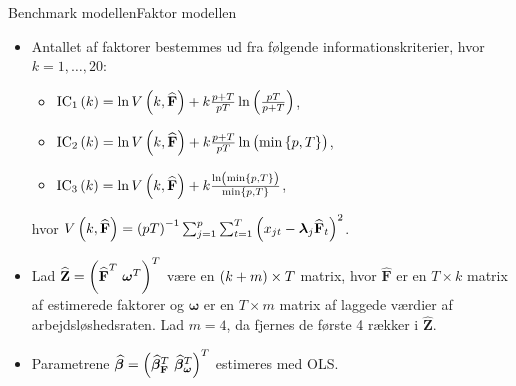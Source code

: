 \begin{frame}{Benchmark modellen}{Faktor modellen}
\begin{itemize}
\item Antallet af faktorer bestemmes ud fra følgende informationskriterier, hvor \(k = 1, \ldots, 20\):
\begin{itemize}
\item $\text{IC}_1 \del{k} = \ln V \del{k, \widehat{\mathbf{F}}} + k \frac{p + T}{p T} \ln \del{\frac{p T}{p + T}}$,
\item $\text{IC}_2 \del{k} = \ln V \del{k, \widehat{\mathbf{F}}} + k \frac{p + T}{p T} \ln \del{ \min \cbr{p, T}}$,
\item $\text{IC}_3 \del{k} = \ln V \del{k, \widehat{\mathbf{F}}} + k \frac{\ln \del{\min \cbr{p, T}}}{\min \cbr{p, T}}$,
\end{itemize}
hvor \(V \del{k, \widehat{\mathbf{F}}} = \del{p T}^{-1} \sum_{j=1}^p \sum_{t=1}^{T} \del{x_{jt} -\boldsymbol{\lambda}_j \widehat{\mathbf{F}}_t}^2\).
\item Lad \(\widehat{\textbf{Z}} = \del{\widehat{{\textbf{F}}}^T \ \boldsymbol{\omega}^T}^T\) være en \(\del{k+m} \times T\) matrix, hvor \(\widehat{{\textbf{F}}}\) er en \(T \times k\) matrix af estimerede faktorer og \(\boldsymbol{\omega}\) er en \(T \times m\) matrix af laggede værdier af arbejdsløshedsraten.
Lad \(m = 4\), da fjernes de første 4 rækker i \(\widehat{\textbf{Z}}\).
\item Parametrene $\widehat{\boldsymbol{\beta}} = \del{ \widehat{\boldsymbol{\beta}}^T_{\textbf{F}} \ \widehat{\boldsymbol{\beta}}^T_{\boldsymbol{\omega}}}^T$ estimeres med OLS.
\end{itemize}
\end{frame}

